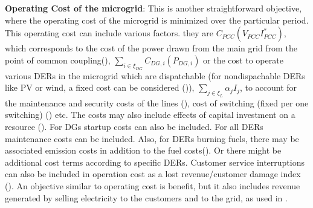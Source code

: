 \textbf{Operating Cost of the microgrid}: This is another straightforward objective, where the operating cost of the microgrid is minimized over the particular period. This operating cost can include various factors. they are $C_{PCC}\left(V_{PCC}I_{PCC}^*\right)$, which corresponds to the cost of the power drawn from the main grid from the point of common coupling(\citep{mgrj07}), $\sum\limits_{i\in\xi_{DG}}C_{DG,i}\left(P_{DG,i}\right)$ or the cost to operate various DERs in the microgrid which are dispatchable (for nondispachable DERs like PV or wind, a fixed cost can be considered (\citep{mgrj49})), $\sum\limits_{j\in\xi_L}\alpha_jI_j$, to account for the maintenance and security costs of the lines (\citep{mgrj02}), cost of switching (fixed per one switching) (\citep{mgrj15}) etc. The costs may also include effects of capital investment on a resource (\citep{mgrj15}). For DGs startup costs can also be included. For all DERs maintenance costs can be included. Also, for DERs burning fuels, there may be associated emission costs in addition to the fuel costs(\citep{mgrj15}). Or there might be additional cost terms according to specific DERs. Customer service interruptions can also be included in operation cost as a lost revenue/customer damage index (\citep{mgrj49}). An objective similar to operating cost is benefit, but it also includes revenue generated by selling electricity to the customers and to the grid, as used in \citep{mgrj15}.\\
